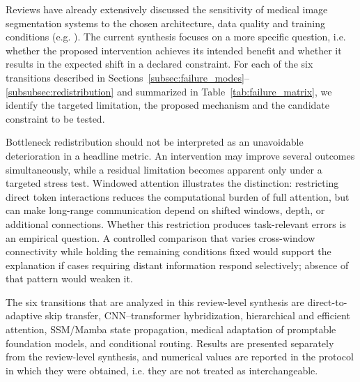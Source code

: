 \documentclass[5p,times,authoryear]{elsarticle}
\begin{document}
Reviews have already extensively discussed the sensitivity of medical image segmentation systems to the chosen architecture, data quality and training conditions (e.g. \citep{azad2024unet_verified,tajbakhsh2020embracing}). The current synthesis focuses on a more specific question, i.e. whether the proposed intervention achieves its intended benefit and whether it results in the expected shift in a declared constraint. For each of the six transitions described in Sections~\ref{subsec:failure_modes}--\ref{subsubsec:redistribution} and summarized in Table~\ref{tab:failure_matrix}, we identify the targeted limitation, the proposed mechanism and the candidate constraint to be tested.

Bottleneck redistribution should not be interpreted as an unavoidable deterioration in a headline metric. An intervention may improve several outcomes simultaneously, while a residual limitation becomes apparent only under a targeted stress test. Windowed attention illustrates the distinction: restricting direct token interactions reduces the computational burden of full attention, but can make long-range communication depend on shifted windows, depth, or additional connections. Whether this restriction produces task-relevant errors is an empirical question. A controlled comparison that varies cross-window connectivity while holding the remaining conditions fixed would support the explanation if cases requiring distant information respond selectively; absence of that pattern would weaken it.

The six transitions that are analyzed in this review-level synthesis are direct-to-adaptive skip transfer, CNN--transformer hybridization, hierarchical and efficient attention, SSM/Mamba state propagation, medical adaptation of promptable foundation models, and conditional routing. Results are presented separately from the review-level synthesis, and numerical values are reported in the protocol in which they were obtained, i.e. they are not treated as interchangeable.
\end{document}
